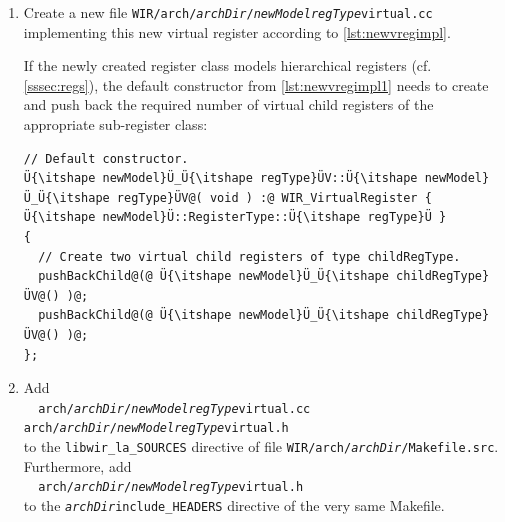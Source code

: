 \begin{enumerate}[resume]
\begin{lstlisting}[style=code,float=!t,caption={Header File for a New Virtual Register's Class},label=lst:newvregheader]
    // Destructor.
    virtual ~Ü{\itshape newModel}Ü_Ü{\itshape regType}ÜV@( void )@;Ü\label{lst:newvregheader5}Ü

    // Copy-assignment operator.
    Ü{\itshape newModel}Ü_Ü{\itshape regType}ÜV æ&æ operator æ=æ @(@ const Ü{\itshape newModel}Ü_Ü{\itshape regType}ÜV æ&æo @)@;Ü\label{lst:newvregheader6}Ü

    // Move-assignment operator.
    Ü{\itshape newModel}Ü_Ü{\itshape regType}ÜV æ&æ operator æ=æ @(@ Ü{\itshape newModel}Ü_Ü{\itshape regType}ÜV æ&&æo @)@;Ü\label{lst:newvregheader7}Ü

  protected:

    // Create a deep copy of a virtual register.
    virtual Ü{\itshape newModel}Ü_Ü{\itshape regType}ÜV æ*æclone@( void )@ const;Ü\label{lst:newvregheader8}Ü
};

}       // namespace WIR

^#endif^
\end{lstlisting}

  Have this header file included by file \texttt{WIR/arch/{\itshape archDir}/{\itshape newModel}.h}.

  \item Create a new file \texttt{WIR/arch/{\itshape archDir}/{\itshape newModelregType}virtual.cc} implementing this new virtual register according to \cref{lst:newvregimpl}.

  If the newly created register class models hierarchical registers (cf. \cref{sssec:regs}), the default constructor from \cref{lst:newvregimpl1} needs to create and push back the required number of virtual child registers of the appropriate sub-register class:
\begin{lstlisting}[style=code,float=!h,xleftmargin=10mm,belowskip=-0.8 \baselineskip]
// Default constructor.
Ü{\itshape newModel}Ü_Ü{\itshape regType}ÜV::Ü{\itshape newModel}Ü_Ü{\itshape regType}ÜV@( void ) :@ WIR_VirtualRegister { Ü{\itshape newModel}Ü::RegisterType::Ü{\itshape regType}Ü }
{
  // Create two virtual child registers of type childRegType.
  pushBackChild@(@ Ü{\itshape newModel}Ü_Ü{\itshape childRegType}ÜV@() )@;
  pushBackChild@(@ Ü{\itshape newModel}Ü_Ü{\itshape childRegType}ÜV@() )@;
};
\end{lstlisting}

  \item Add \\
  \verb|  arch/|\texttt{\itshape archDir}\verb|/|\texttt{\itshape newModelregType}\verb|virtual.cc arch/|\texttt{\itshape archDir}\verb|/|\texttt{\itshape newModelregType}\verb|virtual.h| \\
  to the \texttt{libwir\_la\_SOURCES} directive of file \texttt{WIR/arch/{\itshape archDir}/Makefile.src}.
  Furthermore, add \\
  \verb|  arch/|\texttt{\itshape archDir}\verb|/|\texttt{\itshape newModelregType}\verb|virtual.h| \\
  to the \texttt{{\itshape archDir}include\_HEADERS} directive of the very same Makefile.
\end{enumerate}

